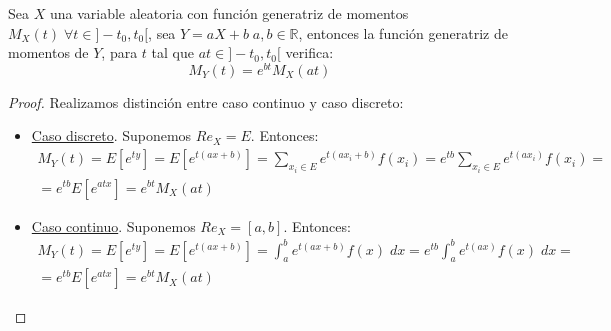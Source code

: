 \begin{prop}
    Sea $X$ una variable aleatoria con función generatriz de momentos $M_X(t)\;\forall t \in ]-t_0, t_0[$, sea $Y = aX +b\;a, b \in \mathbb{R}$, entonces la función generatriz de momentos de $Y$, para $t$ tal que $at \in ]-t_0, t_0[$ verifica:
    \begin{equation*}
        M_Y(t) = e^{bt}M_X(at)
    \end{equation*}
\end{prop}
\begin{proof}
    Realizamos distinción entre caso continuo y caso discreto:
    \begin{itemize}
        \item \underline{Caso discreto}. Suponemos $Re_X = E$. Entonces:
        \begin{multline*}
            M_Y(t) = E[e^{ty}] = E[e^{t(ax+b)}] = \sum_{x_i\in E} e^{t(ax_i+b)}f(x_i)
            = e^{tb}\sum_{x_i\in E} e^{t(ax_i)}f(x_i)
            =\\= e^{tb}E[e^{atx}] = e^{bt}M_X(at)
        \end{multline*}

        \item \underline{Caso continuo}. Suponemos $Re_X = [a,b]$. Entonces:
        \begin{multline*}
            M_Y(t) = E[e^{ty}] = E[e^{t(ax+b)}] = \int_a^b e^{t(ax+b)}f(x)\;dx
            = e^{tb}\int_a^b e^{t(ax)}f(x)\;dx
            =\\= e^{tb}E[e^{atx}] = e^{bt}M_X(at)
        \end{multline*}
    \end{itemize}
\end{proof}
